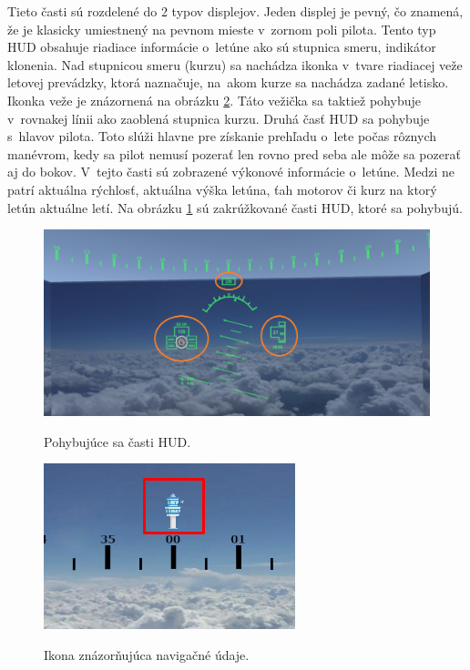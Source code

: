 Tieto časti sú rozdelené do 2 typov displejov. Jeden displej je pevný, čo znamená, že je klasicky umiestnený na pevnom mieste v~zornom poli pilota. Tento typ HUD obsahuje riadiace informácie o~letúne ako sú stupnica smeru, indikátor klonenia. Nad stupnicou smeru (kurzu) sa nachádza ikonka v~tvare riadiacej veže letovej prevádzky, ktorá naznačuje, na~akom kurze sa nachádza zadané letisko. Ikonka veže je znázornená na obrázku \ref{tower}. Táto vežička sa taktiež pohybuje v~rovnakej línii ako zaoblená stupnica kurzu. Druhá časť HUD sa pohybuje s~hlavov pilota. Toto slúži hlavne pre získanie prehľadu o~lete počas rôznych manévrom, kedy sa pilot nemusí pozerať len rovno pred seba ale môže sa pozerať aj do bokov. V~tejto časti sú zobrazené výkonové informácie o~letúne. Medzi ne patrí aktuálna rýchlosť, aktuálna výška letúna, ťah motorov či kurz na ktorý letún aktuálne letí. Na obrázku \ref{rozdelenie} sú zakrúžkované časti HUD, ktoré sa pohybujú.

\begin{figure}[ht]
\centering
\includegraphics[scale=0.45]{obrazky-figures/rozdelenie.png}
\caption{Pohybujúce sa časti HUD.}{\label{rozdelenie}}
\end{figure}

\begin{figure}[ht]
\centering
\includegraphics[]{obrazky-figures/Tower.png}
\caption{Ikona znázorňujúca navigačné údaje.}{\label{tower}}
\end{figure}

